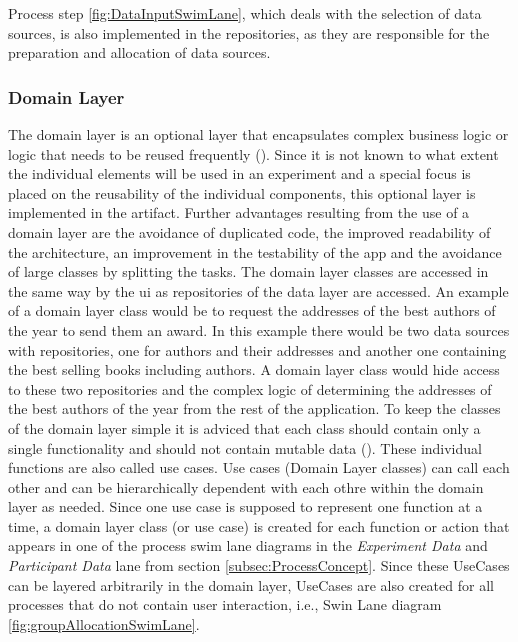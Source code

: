 
Process step \ref{fig:DataInputSwimLane}, which deals with the selection of data sources, is also implemented in the repositories, as they are responsible for the preparation and allocation of data sources.

\subsubsection{Domain Layer}

The domain layer is an optional layer that encapsulates complex business logic or logic that needs to be reused frequently (\cite{Google.2023}). Since it is not known to what extent the individual elements will be used in an experiment and a special focus is placed on the reusability of the individual components, this optional layer is implemented in the artifact. Further advantages resulting from the use of a domain layer are the avoidance of duplicated code, the improved readability of the architecture, an improvement in the testability of the app and the avoidance of large classes by splitting the tasks. The domain layer classes are accessed in the same way by the \ac{ui} as repositories of the data layer are accessed. An example of a domain layer class would be to request the addresses of the best authors of the year to send them an award. In this example there would be two data sources with repositories, one for authors and their addresses and another one containing the best selling books including authors. A domain layer class would hide access to these two repositories and the complex logic of determining the addresses of the best authors of the year from the rest of the application. To keep the classes of the domain layer simple it is adviced that each class should contain only a single functionality and should not contain mutable data (\cite{Google.2023}). These individual functions are also called use cases. Use cases (Domain Layer classes) can call each other and can be hierarchically dependent with each othre within the domain layer as needed. Since one use case is supposed to represent one function at a time, a domain layer class (or use case) is created for each function or action  that appears in one of the process swim lane diagrams in the \textit{Experiment Data} and \textit{Participant Data} lane from section \ref{subsec:ProcessConcept}. Since these UseCases can be layered arbitrarily in the domain layer, UseCases are also created for all processes that do not contain user interaction, i.e., Swin Lane diagram \ref{fig:groupAllocationSwimLane}.

